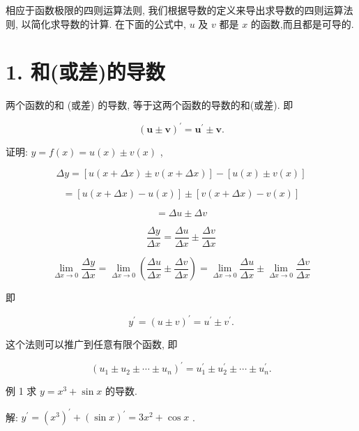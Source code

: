 \documentclass[lang=cn,newtx,10pt,scheme=chinese]{elegantbook}
\begin{document}
相应于函数极限的四则运算法则, 我们根据导数的定义来导出求导数的四则运算法则, 以简化求导数的计算. 在下面的公式中, \(u\) 及 \(v\) 都是 \(x\) 的函数,而且都是可导的.

\section*{1. 和(或差)的导数}

\begin{proposition}[导数和差法则]
两个函数的和 (或差) 的导数, 等于这两个函数的导数的和(或差). 即

\[
{\left( \mathbf{u} \pm \mathbf{v}\right) }^{\prime } = {\mathbf{u}}^{\prime } \pm \mathbf{v}.
\]

\end{proposition}

证明: \(y = f\left( x\right) = u\left( x\right) \pm v\left( x\right)\) ,

\[
{\Delta y} = \left\lbrack {u\left( {x + {\Delta x}}\right) \pm v\left( {x + {\Delta x}}\right) }\right\rbrack - \left\lbrack {u\left( x\right) \pm v\left( x\right) }\right\rbrack
\]

\[
= \left\lbrack {u\left( {x + {\Delta x}}\right) - u\left( x\right) }\right\rbrack \pm \left\lbrack {v\left( {x + {\Delta x}}\right) - v\left( x\right) }\right\rbrack
\]

\[
= {\Delta u} \pm {\Delta v}
\]

\[
\frac{\Delta y}{\Delta x} = \frac{\Delta u}{\Delta x} \pm \frac{\Delta v}{\Delta x}
\]

\[
\mathop{\lim }\limits_{{{\Delta x} \rightarrow 0}}\frac{\Delta y}{\Delta x} = \mathop{\lim }\limits_{{{\Delta x} \rightarrow 0}}\left( {\frac{\Delta u}{\Delta x} \pm \frac{\Delta v}{\Delta x}}\right) = \mathop{\lim }\limits_{{{\Delta x} \rightarrow 0}}\frac{\Delta u}{\Delta x} \pm \mathop{\lim }\limits_{{{\Delta x} \rightarrow 0}}\frac{\Delta v}{\Delta x}
\]

即

\[
{y}^{\prime } = {\left( u \pm v\right) }^{\prime } = {u}^{\prime } \pm {v}^{\prime }.
\]

这个法则可以推广到任意有限个函数, 即

\[
{\left( {u}_{1} \pm {u}_{2} \pm \cdots \pm {u}_{n}\right) }^{\prime } = {u}_{1}^{\prime } \pm {u}_{2}^{\prime } \pm \cdots \pm {u}_{n}^{\prime }.
\]

例 1 求 \(y = {x}^{3} + \sin x\) 的导数.

解: \({y}^{\prime } = {\left( {x}^{3}\right) }^{\prime } + {\left( \sin x\right) }^{\prime } = 3{x}^{2} + \cos x\) .
\end{document}
